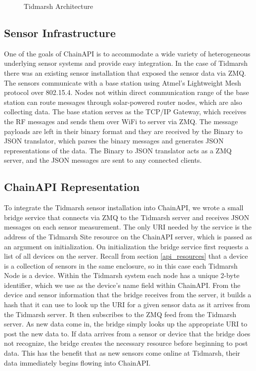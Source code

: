 \documentclass{acm_proc_article-sp}
\begin{document}
\begin{figure}
    \centering
    
    \caption{Tidmarsh Architecture}
    \label{tidmarsh_arch}
\end{figure}

\subsection{Sensor Infrastructure}

One of the goals of ChainAPI is to accommodate a wide variety of heterogeneous
underlying sensor systems and provide easy integration. In the case of Tidmarsh
there was an existing sensor installation that exposed the sensor data via ZMQ.
The sensors communicate with a base station using Atmel's Lightweight Mesh
protocol over 802.15.4. Nodes not within direct communication range of the base
station can route messages through solar-powered router nodes, which are also
collecting data. The base station serves as the TCP/IP Gateway, which receives
the RF messages and sends them over WiFi to server via ZMQ. The message
payloads are left in their binary format and they are received by the Binary to
JSON translator, which parses the binary messages and generates JSON
representations of the data. The Binary to JSON translator acts as a ZMQ
server, and the JSON messages are sent to any connected clients.

\subsection{ChainAPI Representation}

To integrate the Tidmarsh sensor installation into ChainAPI, we wrote a small
bridge service that connects via ZMQ to the Tidmarsh server and receives JSON
messages on each sensor measurement. The only URI needed by the service
is the address of the Tidmarsh Site resource on the ChainAPI server, which is
passed as an argument on initialization. On initialization the bridge service
first requests a list of all devices on the server. Recall from section
\ref{api_resources} that a device is a collection of sensors in the same
enclosure, so in this case each Tidmarsh Node is a device. Within the Tidmarsh
system each node has a unique 2-byte identifier, which we use as the device's
name field within ChainAPI. From the device and sensor information that the
bridge receives from the server, it builds a hash that it can use to look up
the URI for a given sensor data as it arrives from the Tidmarsh server. It then
subscribes to the ZMQ feed from the Tidmarsh server. As new data come in, the
bridge simply looks up the appropriate URI to post the new data to. If data
arrives from a sensor or device that the bridge does not recognize, the bridge
creates the necessary resource before beginning to post data. This has the
benefit that as new sensors come online at Tidmarsh, their data immediately
begins flowing into ChainAPI.
\end{document}
